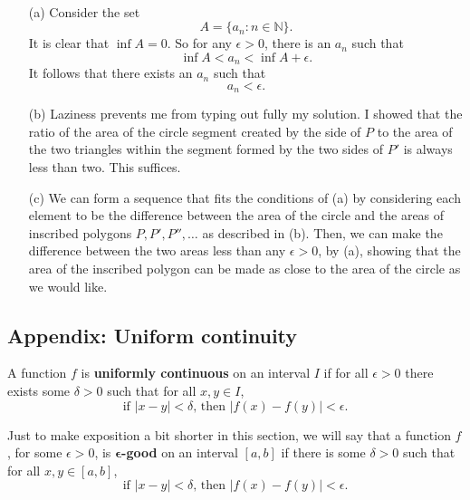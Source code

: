 \begin{problem}[8-11] \ 
\begin{enumerate}
\item[(a)]
Consider the set
\[ A = \{a_n: n \in \mathbb{N}\}. \]
It is clear that $\inf A = 0$. So for any $\epsilon > 0$, there is an $a_n$ such that 
\[ \inf A <  a_n < \inf A + \epsilon. \]
It follows that there exists an $a_n$ such that
\[ a_n < \epsilon. \]

\item[(b)]
Laziness prevents me from typing out fully my solution. I showed that the ratio of the area of the circle segment created by the side of $P$ to the area of the two triangles within the segment formed by the two sides of $P'$ is always less than two. This suffices.

\item[(c)]
We can form a sequence that fits the conditions of (a) by considering each element to be the difference between the area of the circle and the areas of inscribed polygons $P, P', P'', \ldots$ as described in (b). Then, we can make the difference between the two areas less than any $\epsilon > 0$, by (a), showing that the area of the inscribed polygon can be made as close to the area of the circle as we would like.

\end{enumerate}
\end{problem}

\subsection{Appendix: Uniform continuity}

\begin{definition}
A function $f$ is \textbf{uniformly continuous} on an interval $I$ if for all $\epsilon > 0$ there exists some $\delta > 0$ such that for all $x, y \in I$,
\[ \textrm{if } |x - y| < \delta \textrm{, then } |f(x) - f(y)| < \epsilon. \]
\end{definition}

\begin{definition}
Just to make exposition a bit shorter in this section, we will say that a function $f$, for some $\epsilon > 0$, is $\boldsymbol{\epsilon}$\textbf{-good} on an interval $[a, b]$ if there is some $\delta > 0$ such that for all $x, y \in [a, b]$,
\[ \textrm{if } |x - y| < \delta \textrm{, then } |f(x) - f(y)| < \epsilon. \]
\end{definition}

